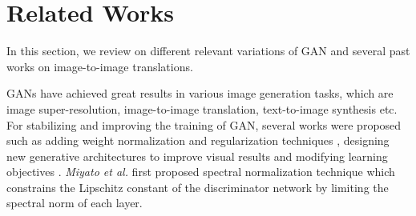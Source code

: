 \documentclass[conference]{IEEEtran}
\begin{document}
\section{Related Works}
In this section, we review on different relevant variations of GAN and several past works on image-to-image translations.

GANs have achieved great results in various image generation tasks, which are image super-resolution\cite{DBLP:journals/corr/JohnsonAL16}, image-to-image translation\cite{DBLP:conf/iccv/ZhuPIE17,DBLP:journals/corr/abs-1810-04991,DBLP:journals/corr/LiuBK17}, text-to-image synthesis\cite{DBLP:journals/corr/ZhangXLZHWM16,DBLP:journals/corr/ReedAYLSL16} etc. For stabilizing and improving the training of GAN, several works were proposed such as adding weight normalization and regularization techniques \cite{DBLP:journals/corr/GulrajaniAADC17, DBLP:journals/corr/abs-1802-05957}, designing new generative architectures\cite{DBLP:journals/corr/RadfordMC15, karras2017progressive} to improve visual results and modifying learning objectives \cite{Arjovsky2017WassersteinG,metz2016unrolled}. \textit{Miyato et al.}\cite{DBLP:journals/corr/abs-1802-05957} first proposed spectral normalization technique which constrains the Lipschitz constant of the discriminator network by limiting the spectral norm of each layer. 
\end{document}
